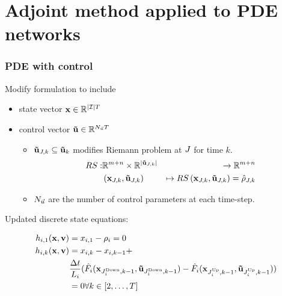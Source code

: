 \section[network adjoint]{Adjoint method applied to PDE networks} %
\label{sec:adjoint_method_applied_to_pde_networks}




\begin{frame}[t]\frametitle{PDE with control}

Modify formulation to include

\begin{itemize}
    \item state vector $\mathbf{x}\in\mathbb{R}^{|\mathcal{I}|T}$
    \item control vector $\mathbf{\vec{u}}\in\mathbb{R}^{N_{\vec{u}}T}$
    \begin{itemize}
        \item $\mathbf{\vec{u}}_{J,k}\subseteq\mathbf{\vec{u}}_{k}$ modifies Riemann problem at $J$ for time $k$.
        \begin{align}
            RS:&\mathbb{R}^{m+n}\times\mathbb{R}^{|\mathbf{\vec{u}}_{J,k}|}&\rightarrow\mathbb{R}^{m+n}\\&\left(\mathbf{x}_{J,k},\mathbf{\vec{u}}_{J,k}\right)&\mapsto RS\left(\mathbf{x}_{J,k},\mathbf{\vec{u}}_{J,k}\right)=\hat{\mathbf{\rho}}_{J,k}
        \end{align}
        \item $N_{\vec{u}}$ are the number of control parameters at each time-step.
    \end{itemize}
\end{itemize}

Updated discrete state equations:

\begin{align}
h_{i,1}(\mathbf{x},\mathbf{v})&=x_{i,1}-\rho_{i}=0\\
h_{i,k}(\mathbf{x},\mathbf{v})&=x_{i,k}-x_{i,k-1}+\\
&\frac{\Delta t}{L_{i}}(\hat{F}_{i}(\mathbf{x}_{J_{i}^{\text{Down}},k-1},\mathbf{\vec{u}}_{J_{i}^{\text{Down}},k-1})-\hat{F}_{i}(\mathbf{x}_{J_{i}^{\text{Up}},k-1},\mathbf{\vec{u}}_{J_{i}^{\text{Up}},k-1}))\\
&=0\forall k\in\left[2,\ldots,T\right]
\end{align}

\end{frame}

